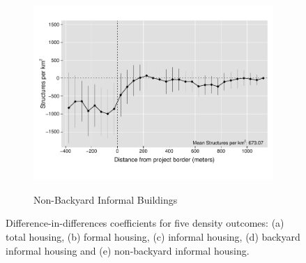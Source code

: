 \documentclass[12pt]{article}
\begin{document}
\begin{figure}[t!]
\begin{subfigure}[b]{0.49\textwidth}
            \label{fig:DDDbackyard}
        \end{subfigure}
        \vskip 1mm \vskip 0pt
        \begin{subfigure}[b]{.49\textwidth}  
            \centering
            \caption[]{Non-Backyard Informal Buildings} 
            \vspace{-2mm}
            \includegraphics[width=\textwidth,trim={0cm .8cm 0cm .6cm}, clip=true]{figures/distplotDDD_bblu_inf_non_backyard_admin}    
            \label{fig:DDDnonbackyard}
        \end{subfigure}
        \hfill \hspace{.02\textwidth}
        \begin{minipage}{0.47\textwidth}   
        \vspace{-6cm}
        \caption[]
        {\small Difference-in-differences coefficients for five density outcomes: (a) total housing, (b) formal housing, (c) informal housing, (d) backyard informal housing and (e) non-backyard informal housing.  } 
		\end{minipage}
        \label{fig:rawbblumeans}
    \end{figure} 
\end{document}
